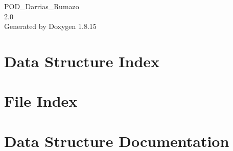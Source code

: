 \let\mypdfximage\pdfximage\def\pdfximage{\immediate\mypdfximage}\documentclass[twoside]{book}
\newcommand{\+}{\discretionary{\mbox{\scriptsize$\hookleftarrow$}}{}{}}
\newcommand{\clearemptydoublepage}{%
  \newpage{\pagestyle{empty}\cleardoublepage}%
}
\begin{document}
\hypersetup{pageanchor=false,
             bookmarksnumbered=true,
             pdfencoding=unicode
            }
\begin{titlepage}
\vspace*{7cm}
\begin{center}%
{\Large P\+O\+D\+\_\+\+Darrias\+\_\+\+Rumazo \\[1ex]\large 2.\+0 }\\
\vspace*{1cm}
{\large Generated by Doxygen 1.8.15}\\
\end{center}
\end{titlepage}
\clearemptydoublepage
{}
\tableofcontents
\clearemptydoublepage
{}
\hypersetup{pageanchor=true}

\chapter{Data Structure Index}

\chapter{File Index}

\chapter{Data Structure Documentation}

\end{document}
